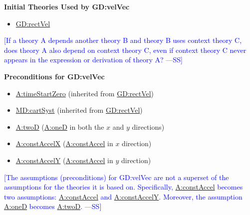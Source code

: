 \documentclass[12pt]{article}
\newcommand{\authornote}[3]{\textcolor{#1}{[#3 ---#2]}}
\newcommand{\authornote}[3]{}
\newcommand{\wss}[1]{\authornote{blue}{SS}{#1}}
\begin{document}
\noindent \textbf{Initial Theories Used by GD:velVec}

\begin{itemize}
\item \hyperref[GD:rectVel]{GD:rectVel}
\end{itemize}

\wss{If a theory A depends another theory B and theory B uses context theory C,
does theory A also depend on context theory C, even if context theory C never
appears in the expression or derivation of theory A?}

\noindent \textbf{Preconditions for GD:velVec}
\begin{itemize}
\item \hyperref[timeStartZero]{A:timeStartZero} (inherited from \hyperref[GD:rectVel]{GD:rectVel})
\item \hyperref[MD:cartSyst]{MD:cartSyst} (inherited from
\hyperref[GD:rectVel]{GD:rectVel})
\item \hyperref[twoD]{A:twoD} (\hyperref[oneD]{A:oneD} in both the $x$ and $y$ directions)
\item \hyperref[constAccelX]{A:constAccelX} (\hyperref[constAccel]{A:constAccel}
in $x$ direction)
\item \hyperref[constAccelY]{A:constAccelY} (\hyperref[constAccel]{A:constAccel}
in $y$ direction)
\end{itemize}

\wss{The assumptions (preconditions) for GD:velVec are not a superset of the assumptions for the theories it is based on.  Specifically, \hyperref[constAccel]{A:constAccel} becomes two assumptions: \hyperref[constAccel]{A:constAccel} and \hyperref[constAccelY]{A:constAccelY}.  Moreover, the assumption \hyperref[oneD]{A:oneD} becomes \hyperref[twoD]{A:twoD}.}
\end{document}
